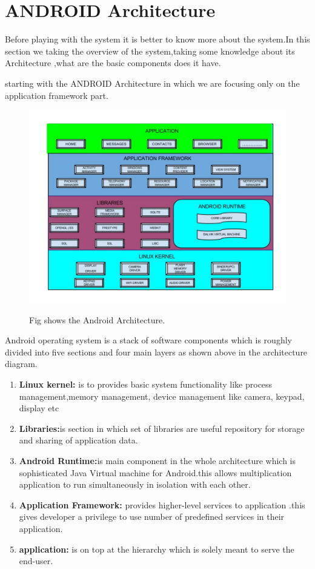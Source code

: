 \documentclass[11pt]{report}
\begin{document}
\chapter{ANDROID Architecture}
Before playing with the system it is better to know more about the system.In this section we taking the overview of the system,taking some knowledge about its Architecture ,what are the basic components does it have.

\par
starting with the ANDROID Architecture in which we are focusing only on the application framework part.
  \begin{figure}[ht!]
\centering
\includegraphics[width=150mm]{./images/system.jpg}
\caption{ Fig shows the Android Architecture. \label{overflow}} \cite{fig}
\end{figure}
Android operating system is a stack of software components which is roughly divided into five sections and four main layers as shown above in the architecture diagram.
\begin{enumerate}
 \item \textbf{Linux kernel:} is to  provides basic system functionality like process management,memory management, device management like camera, keypad, display etc
 \item \textbf{Libraries:}is section in which set of libraries are useful repository for storage and sharing of application data.
 \item \textbf{Android Runtime:}is main component in the whole architecture which is sophisticated Java Virtual machine for Android.this allows multiplication application to run simultaneously in isolation with each other.
 
  \item \textbf{Application Framework:} provides higher-level services to application .this gives developer a privilege to use number of predefined services in their application.
 \item \textbf{application:} is on top at the hierarchy which is solely meant to serve the end-user. 
 \end{enumerate}
\end{document}
